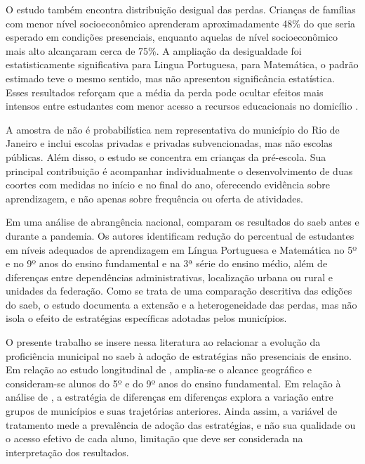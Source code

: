 \documentclass[
	12pt,				%
	openright,			%
	oneside,			%
	a4paper,			%
	brazil,				%
	]{article}
\begin{document}
O estudo também encontra distribuição desigual das perdas. Crianças de famílias
com menor nível socioeconômico aprenderam aproximadamente 48\% do que seria
esperado em condições presenciais, enquanto aquelas de nível socioeconômico mais
alto alcançaram cerca de 75\%. A ampliação da desigualdade foi estatisticamente
significativa para Lingua Portuguesa, para Matemática, o padrão estimado teve o mesmo
sentido, mas não apresentou significância estatística. Esses resultados reforçam
que a média da perda pode ocultar efeitos mais intensos entre estudantes com
menor acesso a recursos educacionais no domicílio \cite{bartholo_koslinski_tymms_castro_2023}.

A amostra de \textcite{bartholo_koslinski_tymms_castro_2023} não é
probabilística nem representativa do município do Rio de Janeiro e inclui escolas
privadas e privadas subvencionadas, mas não escolas públicas. Além disso, o
estudo se concentra em crianças da pré-escola. Sua principal contribuição é
acompanhar individualmente o desenvolvimento de duas coortes com medidas no
início e no final do ano, oferecendo evidência sobre aprendizagem, e não apenas
sobre frequência ou oferta de atividades.

Em uma análise de abrangência nacional, \textcite{BofMoraes2022_ImpactosPandemiaAprendizado}
comparam os resultados do \acrshort{saeb} antes e durante a pandemia. Os autores
identificam redução do percentual de estudantes em níveis adequados de
aprendizagem em Língua Portuguesa e Matemática no 5º e no 9º anos do ensino
fundamental e na 3ª série do ensino médio, além de diferenças entre dependências
administrativas, localização urbana ou rural e unidades da federação. Como se
trata de uma comparação descritiva das edições do \acrshort{saeb}, o estudo
documenta a extensão e a heterogeneidade das perdas, mas não isola o efeito de
estratégias específicas adotadas pelos municípios.

O presente trabalho se insere nessa literatura ao relacionar a evolução da
proficiência municipal no \acrshort{saeb} à adoção de estratégias não presenciais
de ensino. Em relação ao estudo longitudinal de
\textcite{bartholo_koslinski_tymms_castro_2023}, amplia-se o alcance geográfico e
consideram-se alunos do 5º e do 9º anos do ensino fundamental. Em relação à
análise de \textcite{BofMoraes2022_ImpactosPandemiaAprendizado}, a estratégia de
diferenças em diferenças explora a variação entre grupos de municípios e suas
trajetórias anteriores. Ainda assim, a variável de tratamento mede a prevalência
de adoção das estratégias, e não sua qualidade ou o acesso efetivo de cada aluno,
limitação que deve ser considerada na interpretação dos resultados.
\end{document}

